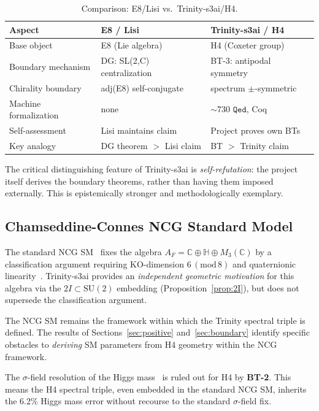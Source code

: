 \documentclass[12pt,a4paper]{article}
\newcommand{\AF}{A_F}
\newcommand{\TwoI}{2I}
\newcommand{\BT}[1]{\textbf{BT-#1}}
\newcommand{\Qed}{\texttt{Qed}}
\begin{document}
\begin{table}[htbp]
  \centering
  \caption{Comparison: E8/Lisi vs.\ Trinity-s3ai/H4.}
  \label{tab:comparison}
  \begin{tabular}{lll}
    \toprule
    Aspect & E8 / Lisi & Trinity-s3ai / H4 \\
    \midrule
    Base object & E8 (Lie algebra) & H4 (Coxeter group) \\
    Boundary mechanism & DG: SL(2,C) centralization & BT-3: antipodal symmetry \\
    Chirality boundary & adj(E8) self-conjugate & spectrum \(\pm\)-symmetric \\
    Machine formalization & none & \(\sim\)730 \(\Qed\), Coq \\
    Self-assessment & Lisi maintains claim & Project proves own BTs \\
    Key analogy & DG theorem $>$ Lisi claim & BT $>$ Trinity claim \\
    \bottomrule
  \end{tabular}
\end{table}

The critical distinguishing feature of Trinity-s3ai is \emph{self-refutation}: the project
itself derives the boundary theorems, rather than having them imposed externally. This is
epistemically stronger and methodologically exemplary.

\subsection{Chamseddine-Connes NCG Standard Model}

The standard NCG SM~\cite{Chamseddine:1996zu,Chamseddine:2007oz} fixes the algebra
\(\AF = \mathbb{C} \oplus \mathbb{H} \oplus M_3(\mathbb{C})\) by a classification argument
requiring KO-dimension \(6\,(\mathrm{mod}\,8)\) and quaternionic linearity~\cite{Chamseddine:2007oz}.
Trinity-s3ai provides an \emph{independent geometric motivation} for this algebra via the
\(\TwoI \subset \mathrm{SU}(2)\) embedding (Proposition~\ref{prop:2I}), but does not supersede
the classification argument.

The NCG SM remains the framework within which the Trinity spectral triple is defined.
The results of Sections~\ref{sec:positive} and~\ref{sec:boundary} identify specific obstacles
to \emph{deriving} SM parameters from H4 geometry within the NCG framework.

The \(\sigma\)-field resolution of the Higgs mass~\cite{Chamseddine:2012qs} is ruled out
for H4 by \BT{2}. This means the H4 spectral triple, even embedded in the standard NCG SM,
inherits the 6.2\% Higgs mass error without recourse to the standard \(\sigma\)-field fix.
\end{document}
